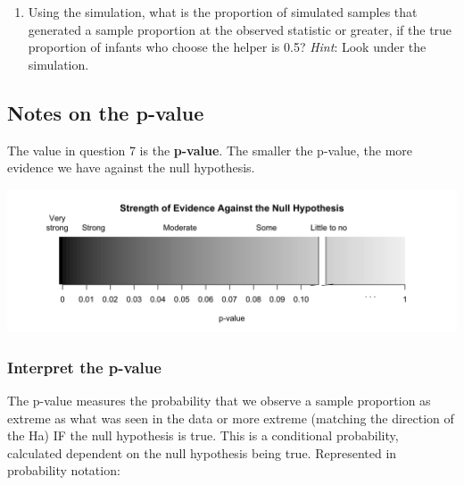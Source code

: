 \documentclass[
]{report}
\providecommand{\tightlist}{%
  \setlength{\itemsep}{0pt}\setlength{\parskip}{0pt}}
\begin{document}
\vspace{0.5in}

\begin{enumerate}
\def\labelenumi{\arabic{enumi}.}
\setcounter{enumi}{6}
\tightlist
\item
  Using the simulation, what is the proportion of simulated samples that generated a sample proportion at the observed statistic or greater, if the true proportion of infants who choose the helper is 0.5? \emph{Hint}: Look under the simulation.
\end{enumerate}

\vspace{0.3in}

\subsection*{Notes on the p-value}\label{notes-on-the-p-value}

The value in question 7 is the \textbf{p-value}. The smaller the p-value, the more evidence we have against the null hypothesis.

\vspace{1.5in}

\begin{center}\includegraphics[width=0.9\linewidth]{images/soe_gradient_gray} \end{center}

\subsubsection*{Interpret the p-value}\label{interpret-the-p-value}

The p-value measures the probability that we observe a sample proportion as extreme as what was seen in the data or more extreme (matching the direction of the Ha) IF the null hypothesis is true. This is a conditional probability, calculated dependent on the null hypothesis being true. Represented in probability notation:
\end{document}
